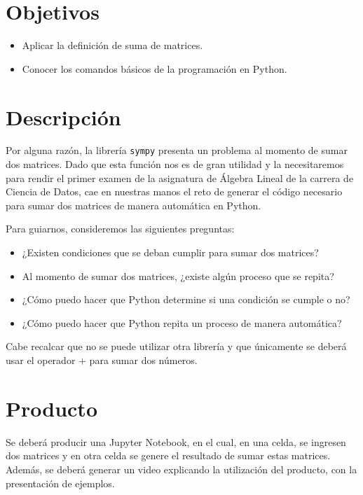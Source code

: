 \documentclass[a4,11pt]{aleph-notas}
\begin{document}
\encabezado

\section{Objetivos}

\begin{itemize}
\item 
    Aplicar la definición de suma de matrices.
\item
    Conocer los comandos básicos de la programación en Python.
\end{itemize}


\section{Descripción}

Por alguna razón, la librería \texttt{sympy} presenta un problema al momento de sumar dos matrices. Dado que esta función nos es de gran utilidad y la necesitaremos para rendir el primer examen de la asignatura de Álgebra Lineal de la carrera de Ciencia de Datos, cae en nuestras manos el reto de generar el código necesario para sumar dos matrices de manera automática en Python.

Para guiarnos, consideremos las siguientes preguntas:
\begin{itemize}
\item 
    ¿Existen condiciones que se deban cumplir para sumar dos matrices?
\item
    Al momento de sumar dos matrices, ¿existe algún proceso que se repita?
\item
    ¿Cómo puedo hacer que Python determine si una condición se cumple o no?
\item
    ¿Cómo puedo hacer que Python repita un proceso de manera automática?
\end{itemize}

Cabe recalcar que no se puede utilizar otra librería y que únicamente se deberá usar el operador $+$ para sumar dos números.


\section{Producto}

Se deberá producir una Jupyter Notebook, en el cual, en una celda, se ingresen dos matrices y en otra celda se genere el resultado de sumar estas matrices. Además, se deberá generar un video explicando la utilización del producto, con la presentación de ejemplos.
\end{document}
